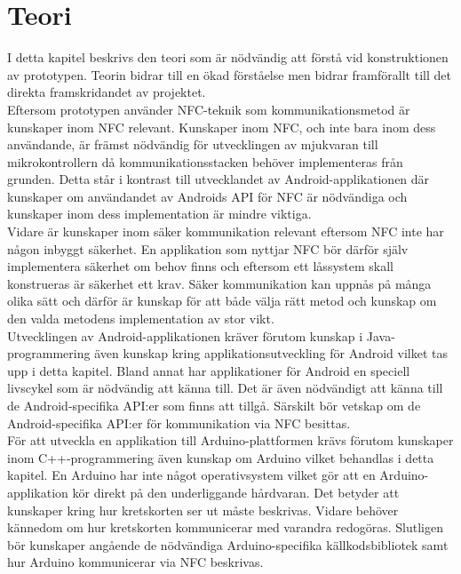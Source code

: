 \documentclass[11pt]{article}
\begin{document}
\section{Teori}
I detta kapitel beskrivs den teori som är nödvändig att förstå vid konstruktionen av prototypen. Teorin bidrar till en ökad förståelse men bidrar framförallt till det direkta framskridandet av projektet.\\
Eftersom prototypen använder NFC-teknik som kommunikationsmetod är kunskaper inom NFC relevant. Kunskaper inom NFC, och inte bara inom dess användande, är främst nödvändig för utvecklingen av mjukvaran till mikrokontrollern då kommunikationsstacken behöver implementeras från grunden. Detta står i kontrast till utvecklandet av Android-applikationen där kunskaper om användandet av Androids API för NFC är nödvändiga och kunskaper inom dess implementation är mindre viktiga.\\
Vidare är kunskaper inom säker kommunikation relevant eftersom NFC inte har någon inbyggt säkerhet. En applikation som nyttjar NFC bör därför själv implementera säkerhet om behov finns och eftersom ett låssystem skall konstrueras är säkerhet ett krav. Säker kommunikation kan uppnås på många olika sätt och därför är kunskap för att både välja rätt metod och kunskap om den valda metodens implementation av stor vikt.\\
Utvecklingen av Android-applikationen kräver förutom kunskap i Java-programmering även kunskap kring applikationsutveckling för Android vilket tas upp i detta kapitel. Bland annat har applikationer för Android en speciell livscykel som är nödvändig att känna till. Det är även nödvändigt att känna till de Android-specifika API:er som finns att tillgå. Särskilt bör vetskap om de Android-specifika API:er för kommunikation via NFC besittas.\\
För att utveckla en applikation till Arduino-plattformen krävs förutom kunskaper inom C++-programmering även kunskap om Arduino vilket behandlas i detta kapitel. En Arduino har inte något operativsystem vilket gör att en Arduino-applikation kör direkt på den underliggande hårdvaran. Det betyder att kunskaper kring hur kretskorten ser ut måste beskrivas. Vidare behöver kännedom om hur kretskorten kommunicerar med varandra redogöras. Slutligen bör kunskaper angående de nödvändiga Arduino-specifika källkodsbibliotek samt hur Arduino kommunicerar via NFC beskrivas.
\end{document}
